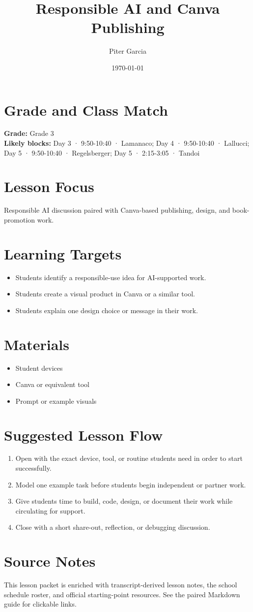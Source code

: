 \documentclass[11pt]{article}
\title{Responsible AI and Canva Publishing}
\author{Piter Garcia}
\date{\today}
\begin{document}
\maketitle

\section*{Grade and Class Match}
\textbf{Grade:} Grade 3\\
\textbf{Likely blocks:} Day 3 · 9:50-10:40 · Lamanaco; Day 4 · 9:50-10:40 · Lallucci; Day 5 · 9:50-10:40 · Regelsberger; Day 5 · 2:15-3:05 · Tandoi

\section*{Lesson Focus}
Responsible AI discussion paired with Canva-based publishing, design, and book-promotion work.

\section*{Learning Targets}
\begin{itemize}[leftmargin=*]
\item Students identify a responsible-use idea for AI-supported work.
\item Students create a visual product in Canva or a similar tool.
\item Students explain one design choice or message in their work.
\end{itemize}

\section*{Materials}
\begin{itemize}[leftmargin=*]
\item Student devices
\item Canva or equivalent tool
\item Prompt or example visuals
\end{itemize}

\section*{Suggested Lesson Flow}
\begin{enumerate}[leftmargin=*]
\item Open with the exact device, tool, or routine students need in order to start successfully.
\item Model one example task before students begin independent or partner work.
\item Give students time to build, code, design, or document their work while circulating for support.
\item Close with a short share-out, reflection, or debugging discussion.
\end{enumerate}

\section*{Source Notes}
This lesson packet is enriched with transcript-derived lesson notes, the school schedule roster, and official starting-point resources. See the paired Markdown guide for clickable links.



\end{document}
